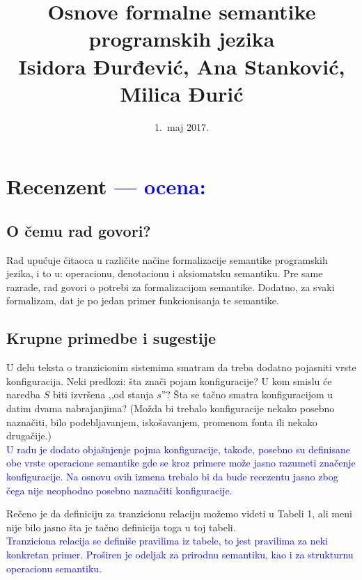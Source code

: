 \documentclass[a4paper]{report}
\newcommand{\odgovor}[1]{\textcolor{blue}{#1}}
\begin{document}
\title{Osnove formalne semantike programskih jezika\\ \small{Isidora Đurđević, Ana Stanković, Milica Đurić}}
\date{1.~maj 2017.}
\maketitle

\tableofcontents

\chapter{Recenzent \odgovor{--- ocena:}}

\section{O čemu rad govori?}

{Rad upućuje čitaoca u različite načine formalizacije semantike programskih jezika, i to u: operacionu, denotacionu i aksiomatsku semantiku. Pre same razrade, rad govori o potrebi za formalizacijom semantike. Dodatno, za svaki formalizam, dat je po jedan primer funkcionisanja te semantike.}

\section{Krupne primedbe i sugestije}

{U delu teksta o tranzicionim sistemima smatram da treba dodatno pojasniti vrste konfiguracija. Neki predlozi: šta znači pojam konfiguracije? U kom smislu će naredba $S$ biti izvršena ‚‚od stanja $s$''? Šta se tačno smatra konfiguracijom u datim dvama nabrajanjima? (Možda bi trebalo konfiguracije nekako posebno naznačiti, bilo podebljavanjem, iskošavanjem, promenom fonta ili nekako drugačije.)}\\
\odgovor{U radu je dodato objašnjenje pojma konfiguracije, takođe, posebno su definisane obe vrste operacione semantike gde se kroz primere može jasno razumeti značenje konfiguracije. Na osnovu ovih izmena trebalo bi da bude recezentu jasno zbog čega nije neophodno posebno naznačiti konfiguracije.}

{Rečeno je da definiciju za tranzicionu relaciju možemo videti u Tabeli 1, ali meni nije bilo jasno šta je tačno definicija toga u toj tabeli.}\\
\odgovor{Tranziciona relacija se definiše pravilima iz tabele, to jest pravilima za neki konkretan primer. Proširen je odeljak za prirodnu semantiku, kao i za strukturnu operacionu semantiku.}
\end{document}
